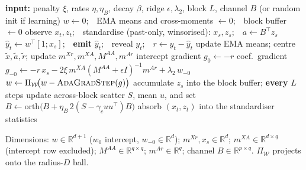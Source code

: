 \documentclass[authoryear,preprint,12pt]{elsarticle}
\theoremstyle{plain}
\theoremstyle{remark}
\newcommand{\R}{\mathbb{R}}
\newcommand{\OARF}{\textsc{OARF}}
\begin{document}
\begin{algorithm}[t]
\caption{\OARF{} with online channel discovery (one streaming pass)}
\label{alg:oarf}
\begin{algorithmic}[1]
\State \textbf{input:} penalty $\xi$, rates $\eta,\eta_B$, decay $\beta$, ridge
$\epsilon,\lambda_2$, block $L$, channel $B$ (or random init if learning)
\State $w\gets 0$;\ \ EMA means and cross-moments $\gets 0$;\ \ block buffer $\gets 0$
  \State observe $x_t,z_t$;\ \ standardise (past-only, winsorised): $x_s,z_s$;\ \ $a\gets B^\top z_s$
  \State $\hat y_t\gets w^\top[1;x_s]$;\ \ \textbf{emit} $\hat y_t$;\ \ reveal $y_t$;\ \ $r\gets y_t-\hat y_t$
  \State update EMA means; centre $\tilde x,\tilde a,\tilde r$; update $m^{Xr},m^{XA},M^{AA},m^{Ar}$
  \State intercept gradient $g_0\gets -r$
  \State coef.\ gradient $g_{-0}\gets -r\,x_s-2\xi\,m^{XA}(M^{AA}+\epsilon I)^{-1}m^{Ar}+\lambda_2\,w_{-0}$
  \State $w\gets \Pi_{\mathcal{W}}\!\big(w-\textsc{AdaGradStep}(g)\big)$ 
     \State accumulate $z_s$ into the block buffer; \textbf{every} $L$ steps update
     across-block scatter $S$, mean $u$, and set $B\gets \mathrm{orth}\big(B+\eta_B\,2(S-\gamma_c uu^\top)B\big)$
  \EndIf
  \State absorb $(x_t,z_t)$ into the standardiser statistics
\EndFor
\end{algorithmic}
{\footnotesize Dimensions: $w\in\R^{d+1}$ ($w_0$ intercept, $w_{-0}\in\R^d$);
$m^{Xr},x_s\in\R^{d}$; $m^{XA}\in\R^{d\times q}$ (intercept row excluded);
$M^{AA}\in\R^{q\times q}$; $m^{Ar}\in\R^{q}$; channel $B\in\R^{p\times q}$.
$\Pi_{\mathcal{W}}$ projects onto the radius-$D$ ball.}
\end{algorithm}
\end{document}
